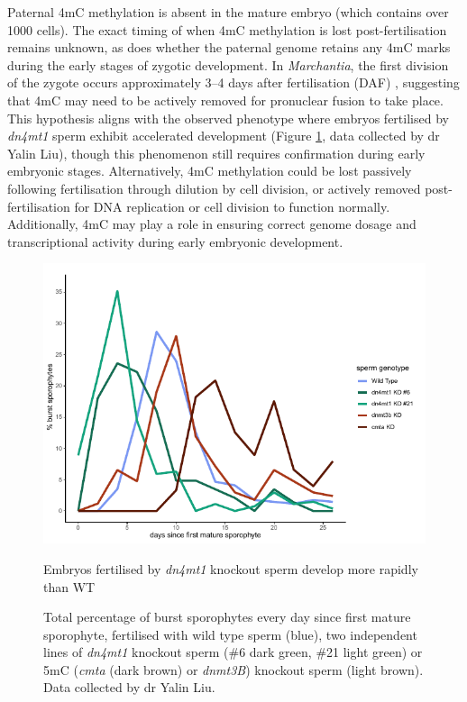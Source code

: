 Paternal 4mC methylation is absent in the mature embryo (which contains over 1000 cells). The exact timing of when 4mC methylation is lost post-fertilisation remains unknown, as does whether the paternal genome retains any 4mC marks during the early stages of zygotic development. In \textit{Marchantia}, the first division of the zygote occurs approximately 3–4 days after fertilisation (DAF) \cite{RN139}, suggesting that 4mC may need to be actively removed for pronuclear fusion to take place. This hypothesis aligns with the observed phenotype where embryos fertilised by \textit{dn4mt1} sperm exhibit accelerated development (Figure \ref{fig:burstpeak}, data collected by dr Yalin Liu), though this phenomenon still requires confirmation during early embryonic stages. Alternatively, 4mC methylation could be lost passively following fertilisation through dilution by cell division, or actively removed post-fertilisation for DNA replication or cell division to function normally. Additionally, 4mC may play a role in ensuring correct genome dosage and transcriptional activity during early embryonic development.

\begin{figure}[htbp!] 
\centering    
    \includegraphics[width=1\textwidth]{Chapter3/Figs/Intro/burstpeak_nuclei_number.pdf}
\caption{Embryos fertilised by \textit{dn4mt1} knockout sperm develop more rapidly than WT}
\label{fig:burstpeak}
\captionsetup{font=small}
    \caption*{Total percentage of burst sporophytes every day since first mature sporophyte, fertilised with wild type sperm (blue), two independent lines of \textit{dn4mt1} knockout sperm (\#6 dark green, \#21 light green) or 5mC (\textit{cmta} (dark brown) or \textit{dnmt3B}) knockout sperm (light brown). Data collected by dr Yalin Liu.}
\end{figure}

